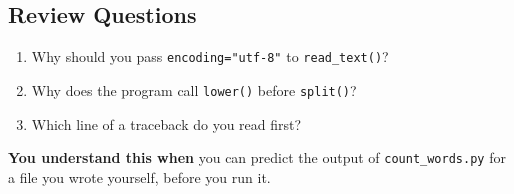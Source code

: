 \subsection*{Review Questions}\label{02-counting-words-with-python:review-questions}

\begin{enumerate}
\def\labelenumi{\arabic{enumi}.}
\tightlist
\item
  Why should you pass \texttt{encoding="utf-8"} to \texttt{read\_text()}?
\item
  Why does the program call \texttt{lower()} before \texttt{split()}?
\item
  Which line of a traceback do you read first?
\end{enumerate}

\begin{understandbox}

\textbf{You understand this when} you can predict the output of \texttt{count\_words.py} for a file you wrote yourself, before you run it.

\end{understandbox}
